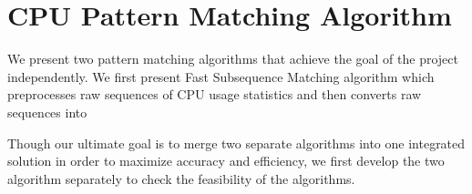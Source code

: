 \section{CPU Pattern Matching Algorithm}
\label{sec:algorithms}

We present two pattern matching algorithms that achieve the goal of the project independently.
We first present Fast Subsequence Matching algorithm which preprocesses raw sequences of CPU usage statistics and then converts raw sequences into 


Though our ultimate goal is to merge two separate algorithms into one integrated solution in order to maximize accuracy and efficiency, we first develop the two algorithm separately to check the feasibility of the algorithms.


